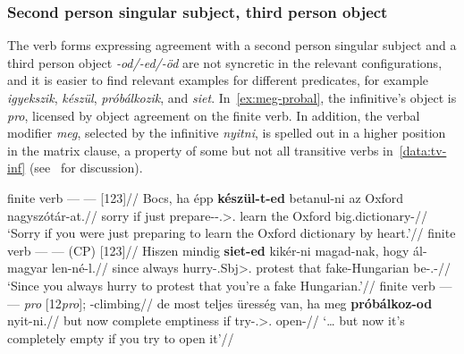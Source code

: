 \subsubsection{Second person singular subject, third person object}\label{sub:2-3}

The verb forms expressing agreement with a second person singular subject and a
third person object \emph{-od/-ed/-öd} are not syncretic in the relevant
configurations, and it is easier to find relevant examples for different
predicates, for example \emph{igyekszik}, \emph{készül}, \emph{próbálkozik},
and \emph{siet}. In~\eqref{ex:meg-probal}, the infinitive's object is
\emph{pro}, licensed by object agreement on the finite verb. In addition, the
verbal modifier \emph{meg}, selected by the infinitive \emph{nyitni}, is
spelled out in a higher position in the matrix clause, a property of some but
not all transitive verbs in~\eqref{data:tv-inf}
(see~\citealt[18--22]{EKissvanRie2004b} for discussion).

\ex\label{ex:oxford-keszul}%
    \begingl
        \glpreamble finite verb --- \Inf{} --- \Obj{} [123]//
        \gla 	Bocs, ha épp \textbf{készül-t-ed} betanul-ni az Oxford nagyszótár-at.//
        \glb 	sorry if just prepare-\Pst-\Ssg.\Sbj>\Third.\Obj{} learn the Oxford big.dictionary-\Acc//
        \glft 	\enquote*{Sorry if you were just preparing to learn the Oxford dictionary by heart.}\trailingcitation{}//
    \endgl
\xe
\ex\label{ex:siet-almagyar}
    \begingl
        \glpreamble finite verb --- \Inf{} --- \Obj{} (CP) [123]//
        \gla 	Hiszen mindig \textbf{siet-ed} {kikér-ni magad-nak}, hogy ál-magyar len-né-l.//
        \glb 	since always hurry-\Tsg.Sbj>\Tsg.\Obj{} protest that fake-Hungarian be-\Cond.\Tsg-\Sbj{}//
        \glft 	\enquote*{Since you always hurry to protest that you're a fake Hungarian.}//
    \endgl
\xe
\ex\label{ex:meg-probal}%
    \begingl
        \glpreamble finite verb --- \Inf{} --- \emph{pro} [12\emph{pro}]; \Vm{}-climbing//
        \gla 	\nogloss{\dots} de most teljes üresség van, ha meg
        \textbf{próbálkoz-od} nyit-ni.//
        \glb 	but now complete emptiness \Cop{} if \Vm{} try-\Ssg.\Sbj>\Third.\Obj{} open-\Inf{}//
        \glft 	\enquote*{\dots{} but now it's completely empty if you try to open it}\trailingcitation{}//
    \endgl
\xe

